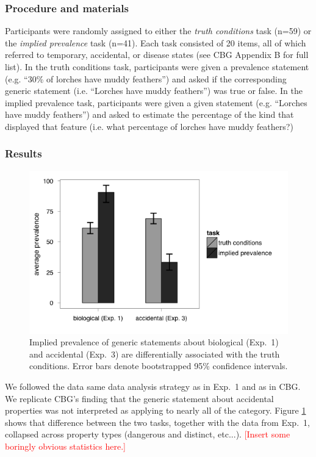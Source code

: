 \documentclass[10pt,letterpaper]{article}
\newcommand{\red}[1]{\textcolor{Red}{#1}}
\begin{document}
\subsubsection{Procedure and materials}

Participants were randomly assigned to either the \emph{truth conditions} task (n=59) or the \emph{implied prevalence} task (n=41). Each task consisted of 20 items, all of which referred to temporary, accidental, or disease states (see CBG Appendix B for full list). In the truth conditions task, participants were given a prevalence statement (e.g. ``30\% of lorches have muddy feathers'') and asked if the corresponding generic statement (i.e. ``Lorches have muddy feathers'') was true or false. In the implied prevalence task, participants were given a given statement (e.g. ``Lorches have muddy feathers'') and asked to estimate the percentage of the kind that displayed that feature (i.e. what percentage of lorches have muddy feathers?)

\subsubsection{Results}

\begin{figure}
\centering
    \includegraphics[width=0.8\columnwidth]{exp3_asymmetry}
    \caption{Implied prevalence of generic statements about biological (Exp.~1) and accidental (Exp.~3) are differentially associated with the truth conditions. Error bars denote bootstrapped 95\% confidence intervals.}
  \label{fig:exp3_asymm}
\end{figure}


We followed the data same data analysis strategy as in Exp.~1 and as in CBG. We replicate CBG's finding that the generic statement about accidental properties was not interpreted as applying to nearly all of the category. Figure \ref{fig:exp3_asymm} shows that difference between the two tasks, together with the data from Exp.~1, collapsed across property types (dangerous and distinct, etc...). \red{[Insert some boringly obvious statistics here.]}
\end{document}

